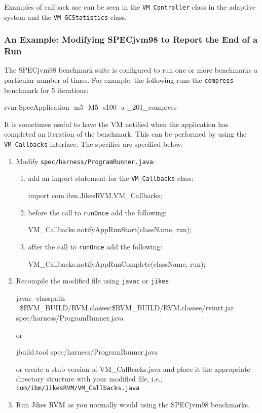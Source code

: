 Examples of callback use can be seen in the {\tt VM\_Controller} class in the
adaptive system and the {\tt VM\_GCStatistics} class.

\subsubsection{An Example: Modifying SPECjvm98 to Report the End of a
                  Run}\label{sssec:callback-example}

The SPECjvm\Rboth{}98 benchmark suite is configured to run one or more
benchmarks 
a particular number of times.  For example, the following runs the
{\tt compress} benchmark for 5 iterations:
\begin{example}
 rvm SpecApplication -m5 -M5 -s100 -a \_201\_compress
\end{example}
It is sometimes useful to have the VM notified when the application
has completed an iteration of the benchmark.   This can be performed
by using the {\tt VM\_Callbacks} interface.  The specifics are
specified below:
\begin{enumerate}
\item Modify {\tt spec/harness/ProgramRunner.java}:
	\begin{enumerate}

	\item add an import statement for the {\tt VM\_Callbacks} class:
        \begin{example}
        import com.ibm.JikesRVM.VM\_Callbacks;
        \end{example}

	\item before the call to {\tt runOnce} add the following:
        \begin{example}
        VM\_Callbacks.notifyAppRunStart(className, run);
        \end{example}

	\item after the call to {\tt runOnce} add the following:
        \begin{example}
        VM\_Callbacks.notifyAppRunComplete(className, run);
        \end{example}

	\end{enumerate}

\item Recompile the modified file using {\tt javac} or {\tt jikes}:
\begin{example}
javac -classpath 
   .:\$RVM\_\-BUILD/\-RVM.clas\-ses:\$RVM\_\-BUILD/\-RVM.clas\-ses/\-rvmrt.jar
   spec/\-har\-ness/\-Pro\-gram\-Run\-ner.java
\end{example}
or
\begin{example}
jbuild.tool spec/\-har\-ness/\-Pro\-gram\-Run\-ner.java
\end{example}

or create a stub version of VM\_Callbacks.java and place
it the appropriate directory structure with your modified file, i.e., 
{\tt com/ibm/JikesRVM/VM\_Callbacks.java}

\item Run Jikes RVM as you normally would using the SPECjvm98 benchmarks.
\end{enumerate}

